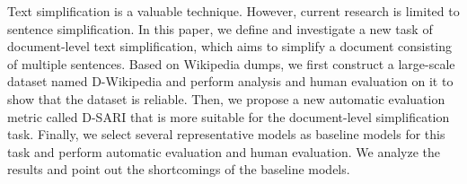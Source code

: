 Text simplification is a valuable technique. However, current research is limited to sentence simplification. In this paper, we define and investigate a new task of document-level text simplification, which aims to simplify a document consisting of multiple sentences. Based on Wikipedia dumps, we first construct a large-scale dataset named D-Wikipedia and perform analysis and human evaluation on it to show that the dataset is reliable. Then, we propose a new automatic evaluation metric called D-SARI that is more suitable for the document-level simplification task. Finally, we select several representative models as baseline models for this task and perform automatic evaluation and human evaluation. We analyze the results and point out the shortcomings of the baseline models.

